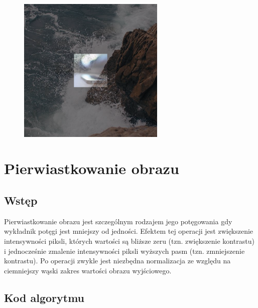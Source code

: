 \documentclass[a4paper,12pt]{book}
\begin{document}
\begin{figure}[H]
	\includegraphics[width=7cm, height=7cm]{3-5/divide-color-images-phone-sea-norm.png}
\end{figure}

\section{Pierwiastkowanie obrazu}
\subsection*{Wstęp}
Pierwiastkowanie obrazu jest szczególnym rodzajem jego potęgowania gdy wykładnik potęgi jest mniejszy od jedności. Efektem tej operacji jest zwiększenie intensywności piksli, których wartości są bliższe zeru (tzn. zwiększenie kontrastu) i jednocześnie zmalenie intensywności piksli wyższych pasm (tzn. zmniejszenie kontrastu). Po operacji zwykle jest niezbędna normalizacja ze względu na ciemniejszy wąski zakres wartości obrazu wyjściowego. 

\subsection*{Kod algorytmu}
\end{document}
